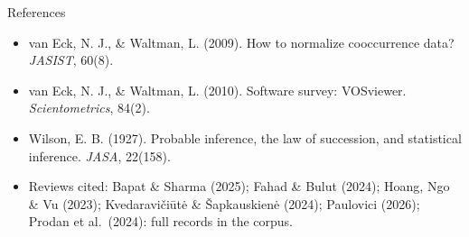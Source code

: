 \documentclass[aspectratio=169,10pt]{beamer}
\begin{document}
\begin{frame}{References}
\begin{itemize}
\item van Eck, N. J., \& Waltman, L. (2009). How to normalize cooccurrence data? \emph{JASIST}, 60(8).
\item van Eck, N. J., \& Waltman, L. (2010). Software survey: VOSviewer. \emph{Scientometrics}, 84(2).
\item Wilson, E. B. (1927). Probable inference, the law of succession, and statistical inference. \emph{JASA}, 22(158).
\item Reviews cited: Bapat \& Sharma (2025); Fahad \& Bulut (2024); Hoang, Ngo \& Vu (2023); Kvedaravi\v{c}i\={u}t\.{e} \& \v{S}apkauskien\.{e} (2024); Paulovici (2026); Prodan et al.\ (2024): full records in the corpus.
\end{itemize}
\end{frame}
\end{document}
